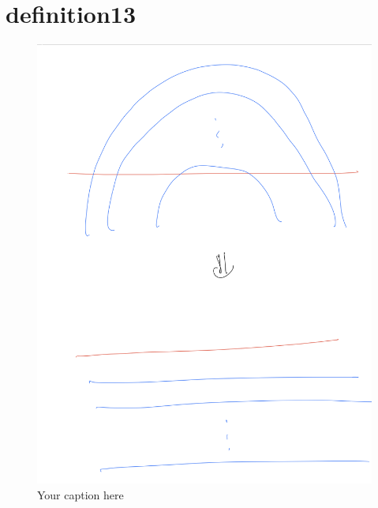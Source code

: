 \section{definition13}
\begin{definition}
\end{definition}

\begin{figure}[H] %
    \centering
    \includegraphics[width=\linewidth]{diagrams/definition13/1.png} %
    \caption{Your caption here}
    \label{fig:your-label}
\end{figure}